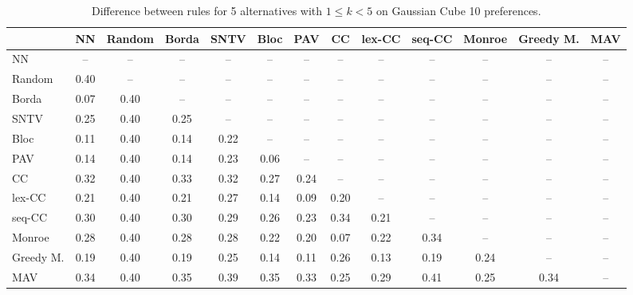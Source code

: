 
\begin{table*}[h!]
\centering
\begin{tabular}{lcccccccccccc}
\toprule
 & NN & Random & Borda & SNTV & Bloc & PAV & CC & lex-CC & seq-CC & Monroe & Greedy M. & MAV \\
\midrule
NN & -- & -- & -- & -- & -- & -- & -- & -- & -- & -- & -- & -- \\
Random & 0.40 & -- & -- & -- & -- & -- & -- & -- & -- & -- & -- & -- \\
Borda & 0.07 & 0.40 & -- & -- & -- & -- & -- & -- & -- & -- & -- & -- \\
SNTV & 0.25 & 0.40 & 0.25 & -- & -- & -- & -- & -- & -- & -- & -- & -- \\
Bloc & 0.11 & 0.40 & 0.14 & 0.22 & -- & -- & -- & -- & -- & -- & -- & -- \\
PAV & 0.14 & 0.40 & 0.14 & 0.23 & 0.06 & -- & -- & -- & -- & -- & -- & -- \\
CC & 0.32 & 0.40 & 0.33 & 0.32 & 0.27 & 0.24 & -- & -- & -- & -- & -- & -- \\
lex-CC & 0.21 & 0.40 & 0.21 & 0.27 & 0.14 & 0.09 & 0.20 & -- & -- & -- & -- & -- \\
seq-CC & 0.30 & 0.40 & 0.30 & 0.29 & 0.26 & 0.23 & 0.34 & 0.21 & -- & -- & -- & -- \\
Monroe & 0.28 & 0.40 & 0.28 & 0.28 & 0.22 & 0.20 & 0.07 & 0.22 & 0.34 & -- & -- & -- \\
Greedy M. & 0.19 & 0.40 & 0.19 & 0.25 & 0.14 & 0.11 & 0.26 & 0.13 & 0.19 & 0.24 & -- & -- \\
MAV & 0.34 & 0.40 & 0.35 & 0.39 & 0.35 & 0.33 & 0.25 & 0.29 & 0.41 & 0.25 & 0.34 & -- \\
\bottomrule
\end{tabular}

\caption{Difference between rules for 5 alternatives with $1 \leq k < 5$ on Gaussian Cube 10 preferences.}
\end{table*}
